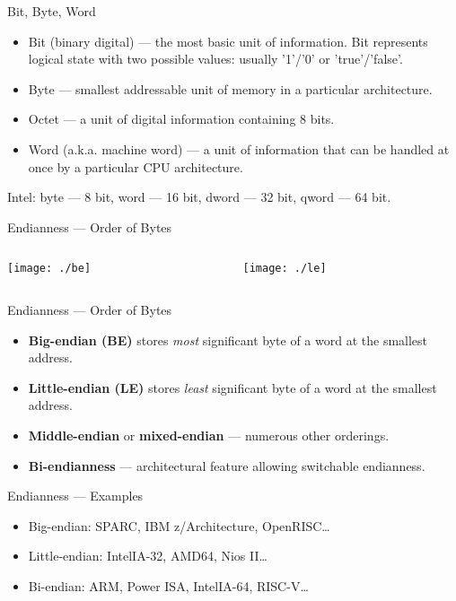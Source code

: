 \begin{frame}{Bit, Byte, Word}
\begin{itemize}
\item Bit (binary digital) \pause --- the most basic unit of information.
  Bit represents logical state with two possible values: usually '1'/'0' or
  'true'/'false'.
\item Byte \pause --- smallest addressable unit of memory in a particular
  architecture.\pause
\item Octet \pause --- a unit of digital information containing 8 bits.\pause
\item Word (a.k.a. machine word) \pause --- a unit of information that can be
  handled at once by a particular CPU architecture.
\end{itemize}
\pause\vfill
Intel: byte --- 8 bit, word --- 16 bit, dword --- 32 bit, qword --- 64 bit.
\end{frame}

\begin{frame}{Endianness --- Order of Bytes}
\begin{columns}[onlytextwidth]
\begin{column}{0.5\textwidth}
\texttt{[image: ./be]}
\end{column}

\begin{column}{0.5\textwidth}
\texttt{[image: ./le]}
\end{column}
\end{columns}
\end{frame}

\begin{frame}{Endianness --- Order of Bytes}
\begin{itemize}
\item \textbf{Big-endian (BE)} stores \textit{most} significant byte of a
  word at the smallest address.
\item \textbf{Little-endian (LE)} stores \textit{least} significant byte of a
  word at the smallest address.\pause
\item \textbf{Middle-endian} or \textbf{mixed-endian} --- numerous other
  orderings.\pause
\item \textbf{Bi-endianness} --- architectural feature allowing switchable
  endianness.
\end{itemize}
\end{frame}

\begin{frame}{Endianness --- Examples}
\begin{itemize}
\item Big-endian: SPARC, IBM z/Architecture, OpenRISC\dots
\item Little-endian: Intel\reg IA-32, AMD64, Nios II\dots
\item Bi-endian: ARM, Power ISA, Intel\reg IA-64, RISC-V\dots
\end{itemize}
\end{frame}

